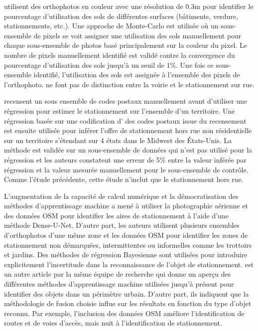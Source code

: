 \textcite{Akbari:AnalyzingLand:2003} utilisent des orthophotos en couleur avec une résolution de 0.3m pour identifier le pourcentage d'utilisation des sols de différentes surfaces (bâtiments, verdure, stationnements, etc.). Une approche de Monte-Carlo est utilisée où un sous-ensemble de pixels se voit assigner une utilisation des sols manuellement pour chaque sous-ensemble de photos basé principalement sur la couleur du pixel. Le nombre de pixels manuellement identifié est validé contre la convergence du pourcentage d'utilisation des sols jusqu'à un seuil de 1\%. Une fois ce sous-ensemble identifié, l'utilisation des sols est assignée à l'ensemble des pixels de l'orthophoto. \citeauthor{Akbari:AnalyzingLand:2003} ne font pas de distinction entre la voirie et le stationnement sur rue.\par
\textcite{Davis:EstimatingParking:2010} recensent un sous ensemble de codes postaux manuellement avant d'utiliser une régression pour estimer le stationnement sur l'ensemble d'un territoire. Une régression basée sur une codification d' \fg{} des codes postaux issue du recensement est ensuite utilisée pour inférer l'offre de stationnement hors rue non résidentielle sur un territoire s'étendant sur 4 états dans le Midwest des États-Unis. La méthode est validée sur un sous-ensemble de données qui n'est pas utilisé pour la régression et les auteurs constatent une erreur de 5\% entre la valeur inférée par régression et la valeur mesurée manuellement pour le sous-ensemble de contrôle. Comme l'étude précédente, cette étude n'inclut que le stationnement hors rue. \par
L'augmentation de la capacité de calcul numérique et la démocratisation des méthodes d'apprentissage machine a mené \textcite{Hellekes:ParkingSpace:2023} à utiliser la photographie aérienne et des données \ac{OSM} pour identifier les aires de stationnement à l'aide d'une méthode Dense-U-Net. D'autre part, les auteurs utilisent plusieurs ensembles d'orthophotos d'une même zone et les données \ac{OSM} pour identifier les zones de stationnement non démarquées, intermittentes ou informelles comme les trottoirs et jardins. Des méthodes de régression Bayesienne sont utilisées pour introduire explicitement l'incertitude dans la reconnaissance de l'objet de stationnement. \textcite{Henry:CitywideEstimation:2021} est un autre article par la même équipe de recherche qui donne un aperçu des différentes méthodes d'apprentissage machine utilisées jusqu'à présent pour identifier des objets dans un périmètre urbain. D'autre part, ils indiquent que la méthodologie de fusion choisie influe sur les résultats en fonction du type d'objet reconnu. Par exemple, l'inclusion des données \ac{OSM} améliore l'identification de routes et de voies d'accès, mais nuit à l'identification de stationnement.  \par

